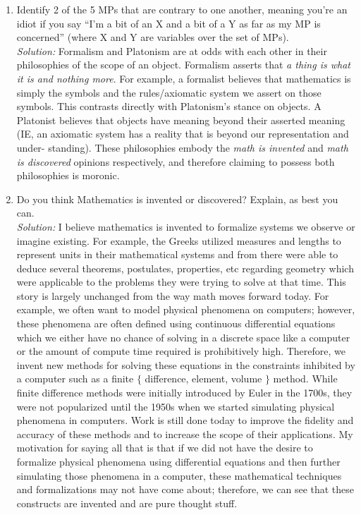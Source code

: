 \documentclass[10pt]{article}
\newcommand{\solution}{\color{blue}\textit{Solution:} \color{black} }
\begin{document}
	\begin{enumerate} 
		\item Identify 2 of the 5 MPs that are contrary to one another, meaning you're an idiot if you say ``I'm a bit of an X and a bit of a Y as far as my MP is concerned'' (where X and Y are variables over the set of MPs).\\

        \solution  Formalism and Platonism are at odds with each other in their philosophies of the scope of an
        object. Formalism asserts that \textit{a thing is what it is and nothing more}. For example, a formalist believes
that mathematics is simply the symbols and the rules/axiomatic system we assert on those symbols. This
contrasts directly with Platonism’s stance on objects. A Platonist believes that objects have meaning beyond
their asserted meaning (IE, an axiomatic system has a reality that is beyond our representation and under-
standing). These philosophies embody the \textit{math is invented} and \textit{math is discovered} opinions respectively,
and therefore claiming to possess both philosophies is moronic.
	
		
		\item Do you think Mathematics is invented or discovered?  
        Explain, as best you can.\\

\solution I believe mathematics is invented to formalize systems we observe or imagine existing. For
example, the Greeks utilized measures and lengths to represent units in their mathematical systems and
from there were able to deduce several theorems, postulates, properties, etc regarding geometry which
were applicable to the problems they were trying to solve at that time. This story is largely unchanged
from the way math moves forward today. For example, we often want to model physical phenomena on
computers; however, these phenomena are often defined using continuous differential equations which we
either have no chance of solving in a discrete space like a computer or the amount of compute time required
is prohibitively high. Therefore, we invent new methods for solving these equations in the constraints
inhibited by a computer such as a finite $\{$ difference, element, volume $\}$ method. While finite difference
methods were initially introduced by Euler in the 1700s, they were not popularized until the 1950s when we
started simulating physical phenomena in computers. Work is still done today to improve the fidelity and
accuracy of these methods and to increase the scope of their applications. My motivation for saying all that
is that if we did not have the desire to formalize physical phenomena using differential equations and
then further simulating those phenomena in a computer, these mathematical techniques and formalizations
may not have come about; therefore, we can see that these constructs are invented and are pure thought
stuff.\\


\end{enumerate}
\end{document}
